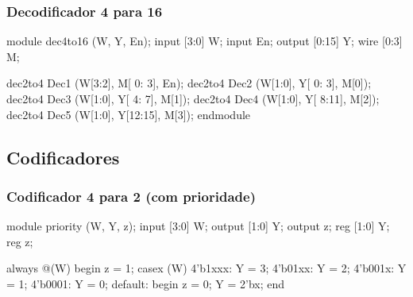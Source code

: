 \begin{frame}[fragile]
	\frametitle{Decodificador 4 para 16}
	\begin{verilogcode}
module dec4to16 (W, Y, En); 
  input [3:0] W;
  input En;
  output [0:15] Y;
  wire [0:3] M;

  dec2to4 Dec1 (W[3:2], M[ 0: 3], En); 
  dec2to4 Dec2 (W[1:0], Y[ 0: 3], M[0]); 
  dec2to4 Dec3 (W[1:0], Y[ 4: 7], M[1]); 
  dec2to4 Dec4 (W[1:0], Y[ 8:11], M[2]); 
  dec2to4 Dec5 (W[1:0], Y[12:15], M[3]);
endmodule
    \end{verilogcode} 
\end{frame}

\subsection{Codificadores}


\begin{frame}[fragile]
	\frametitle{Codificador 4 para 2 (com prioridade)}
	\begin{verilogcode}
module priority (W, Y, z); 
  input [3:0] W;
  output [1:0] Y;
  output z;
  reg [1:0] Y; 
  reg z;

  always @(W) 
  begin
    z = 1; 
    casex (W)
      4'b1xxx: Y = 3;
      4'b01xx: Y = 2;
      4'b001x: Y = 1;
      4'b0001: Y = 0;
      default:
      begin
        z = 0;
        Y = 2'bx;
      end
    \end{verilogcode} 
\end{frame}

